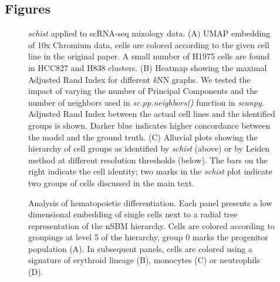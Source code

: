 \documentclass{bmcart}
\def\texttt{[image: ]}
\begin{document}
\begin{backmatter}



\section*{Figures}
\begin{figure}[h!]
\centering
\caption[]{\emph{schist} applied to scRNA-seq mixology data. (A) UMAP embedding of 10x Chromium data, cells are colored according to the given cell line in the original paper. A small number of H1975 cells are found in HCC827 and H838 clusters. (B) Heatmap showing the maximal Adjusted Rand Index for different \emph{k}NN graphs. We tested the impact of varying the number of Principal Components and the number of neighbors used in \emph{sc.pp.neighbors()} function in \emph{scanpy}. Adjusted Rand Index between the actual cell lines and the identified groups is shown. Darker blue indicates higher concordance between the model and the ground truth. (C) Alluvial plots showing the hierarchy of cell groups as identified by \emph{schist} (above) or by Leiden method at different resolution thresholds (below). The bars on the right indicate the cell identity; two marks in the \emph{schist} plot indicate two groups of cells discussed in the main text.}\label{Figure1}
\end{figure}

\begin{figure}[h!]
\centering
\caption[]{Analysis of hematopoietic differentiation. Each panel presents a low dimensional embedding of single cells next to a radial tree representation of the nSBM hierarchy. Cells are colored according to groupings at level 5 of the hierarchy, group 0 marks the progenitor population (A). In subsequent panels, cells are colored using a signature of erythroid lineage (B), monocytes (C) or neutrophils (D).}\label{Figure2}
\end{figure}


\end{backmatter}
\end{document}
